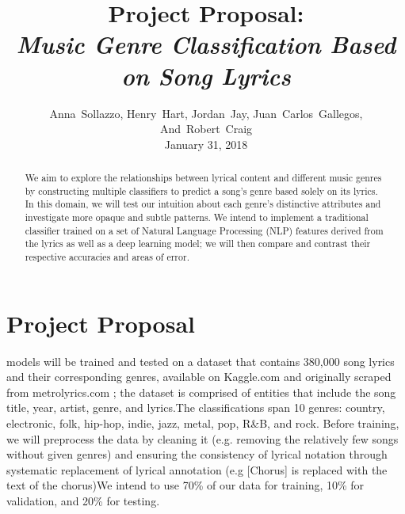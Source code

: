 \documentclass[journal]{IEEEtran}
\begin{document}
\title{Project Proposal:\\\emph{Music Genre Classification Based on Song Lyrics}}

\author{Anna~Sollazzo,
        Henry~Hart,
        Jordan~Jay,
        Juan~Carlos~Gallegos,
        And~Robert~Craig \\ January 31, 2018}
        
\maketitle


\begin{abstract}

    We aim to explore the relationships between lyrical content and different music genres by constructing multiple classifiers to predict a song's genre based solely on its lyrics. In this domain, we will test our intuition about each genre's distinctive attributes and investigate more opaque and subtle patterns. We intend to implement a traditional classifier trained on a set of Natural Language Processing (NLP) features derived from the lyrics as well as a deep learning model; we will then compare and contrast their respective accuracies and areas of error.\par

\end{abstract}

\section{Project Proposal}

     models will be trained and tested on a dataset that contains 380,000 song lyrics and their corresponding genres, available on Kaggle.com and originally scraped from metrolyrics.com \cite{KaggleDataset}; the dataset is comprised of entities that include the song title, year, artist, genre, and lyrics.The classifications span 10 genres: country, electronic, folk, hip-hop, indie, jazz, metal, pop, R\&B, and rock. Before training, we will preprocess the data by cleaning it (e.g. removing the relatively few songs without given genres) and ensuring the consistency of lyrical notation through systematic replacement of lyrical annotation (e.g [Chorus] is replaced with the text of the chorus)We intend to use 70\% of our data for training, 10\% for validation, and 20\% for testing. \par
\end{document}
